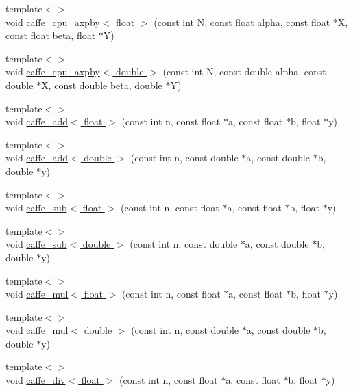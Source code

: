 \begin{DoxyCompactItemize}
\item 
{\footnotesize template$<$$>$ }\\void \hyperlink{namespacecaffe_a80cee6f8f71d4d64423b07251a369c98}{caffe\+\_\+cpu\+\_\+axpby$<$ float $>$} (const int N, const float alpha, const float $\ast$X, const float beta, float $\ast$Y)
\item 
{\footnotesize template$<$$>$ }\\void \hyperlink{namespacecaffe_acdfc74a60bc50fffe61fd27484b6b795}{caffe\+\_\+cpu\+\_\+axpby$<$ double $>$} (const int N, const double alpha, const double $\ast$X, const double beta, double $\ast$Y)
\item 
{\footnotesize template$<$$>$ }\\void \hyperlink{namespacecaffe_a33de0e8c285c49d3388dd9b36cfae096}{caffe\+\_\+add$<$ float $>$} (const int n, const float $\ast$a, const float $\ast$b, float $\ast$y)
\item 
{\footnotesize template$<$$>$ }\\void \hyperlink{namespacecaffe_a7e191890a0b953fafbb5cabb94c185fd}{caffe\+\_\+add$<$ double $>$} (const int n, const double $\ast$a, const double $\ast$b, double $\ast$y)
\item 
{\footnotesize template$<$$>$ }\\void \hyperlink{namespacecaffe_ad95d5c303539634141319733138a1a30}{caffe\+\_\+sub$<$ float $>$} (const int n, const float $\ast$a, const float $\ast$b, float $\ast$y)
\item 
{\footnotesize template$<$$>$ }\\void \hyperlink{namespacecaffe_afbe160a31cb8ba24b9a458b29dd30b29}{caffe\+\_\+sub$<$ double $>$} (const int n, const double $\ast$a, const double $\ast$b, double $\ast$y)
\item 
{\footnotesize template$<$$>$ }\\void \hyperlink{namespacecaffe_a6c2ce80409bbcc2f7628245d0d0961d8}{caffe\+\_\+mul$<$ float $>$} (const int n, const float $\ast$a, const float $\ast$b, float $\ast$y)
\item 
{\footnotesize template$<$$>$ }\\void \hyperlink{namespacecaffe_aa737440327ff64cf24422620fcb7b5f2}{caffe\+\_\+mul$<$ double $>$} (const int n, const double $\ast$a, const double $\ast$b, double $\ast$y)
\item 
{\footnotesize template$<$$>$ }\\void \hyperlink{namespacecaffe_a5da01a3589fb3ed828d3c3ea28dca727}{caffe\+\_\+div$<$ float $>$} (const int n, const float $\ast$a, const float $\ast$b, float $\ast$y)

\end{DoxyCompactItemize}
